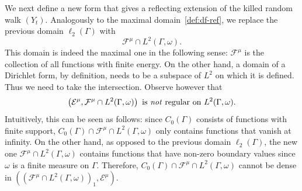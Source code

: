 \documentclass[10pt]{amsart}
\theoremstyle{definition}\newtheorem{defi}[theo]{Definition}\newtheorem{rema}[theo]{Remark}\newtheorem{exam}[theo]{Example}\newtheorem{exem}[theo]{Example}\newtheorem{nota}[theo]{Notation}
\newcommand{\ce}{\mathcal{E}}
\newcommand{\cf}{\mathcal{F}}
\begin{document}
We next define a new form that gives a reflecting extension of the killed random walk $(Y_t)$. Analogously to the maximal domain~\eqref{def:df-ref}, we replace the previous domain $\ell_2(\Gamma)$ with
\[
\cf^{\mu}\cap L^2(\Gamma,\omega).
\]
This domain is indeed the maximal one in the following sense: $\cf^{\mu}$ is the collection of all functions with finite energy. On the other hand, a domain of a Dirichlet form, by definition, needs to be a subspace of $L^2$ on which it is defined. Thus we need to take the intersection. Observe however that
\[
\left(\ce^{\mu}, \cf^{\mu}\cap L^2(\Gamma,\omega)\right)\ \text{is \emph{not} regular on}\ L^2(\Gamma,\omega).
\]
Intuitively, this can be seen as follows: since $C_0(\Gamma)$ consists of functions with finite support, $C_0(\Gamma)\cap\cf^{\mu}\cap L^2(\Gamma,\omega)$ only contains functions that vanish at infinity. On the other hand, as opposed to the previous domain $\ell_2(\Gamma)$, the new one $\cf^{\mu}\cap L^2(\Gamma,\omega)$ contains functions that have non-zero boundary values since $\omega$ is a finite measure on $\Gamma$. Therefore, $C_0(\Gamma)\cap\cf^{\mu}\cap L^2(\Gamma,\omega)$ cannot be dense in $((\cf^{\mu}\cap L^2(\Gamma,\omega))_1,\ce^{\mu})$.
\end{document}
